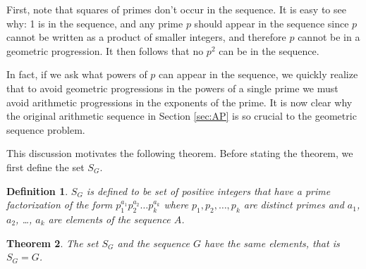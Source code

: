 \documentclass[11pt,letterpaper,twoside,english]{article}
\theoremstyle{theorem}
\newtheorem{theorem}{Theorem}
\newtheorem{definition}[theorem]{Definition}
\theoremstyle{remark}
\begin{document}
First, note that squares of primes don't occur in the sequence. It is easy to see why: 1 is in the sequence, and any prime $p$ should appear in the sequence since $p$ cannot be written as a product of smaller integers, and therefore $p$ cannot be in a geometric progression. It then follows that no $p^2$ can be in the sequence. 

In fact, if we ask what powers of $p$ can appear in the sequence, we quickly realize that to avoid geometric progressions in the powers of a single prime we must avoid arithmetic progressions in the exponents of the prime. It is now clear why the original arithmetic sequence in Section \ref{sec:AP} is so crucial to the geometric sequence problem.

This discussion motivates the following theorem. Before stating the theorem, we first define the set $S_G$.
\begin{definition} \label{def:S_G}
$S_G$ is defined to be set of positive integers that have a prime factorization of the form $p_1^{a_1} p_2^{a_2} \ldots p_k^{a_k}$ where $p_1, p_2, \ldots, p_k$ are distinct primes and $a_1$, $a_2$, \ldots, $a_k$ are elements of the sequence $A$.
\end{definition}

\begin{theorem} \label{thm:mainThmG}
 The set $S_G$ and the sequence $G$ have the same elements, that is $S_G=G$. 
\end{theorem}
\end{document}
